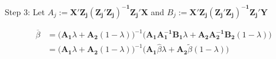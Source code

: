 \documentclass[14pt]{extreport}
\begin{document}
\begin{enumerate}
    Step 3: Let \( A_j := \mathbf{X'Z_j(Z_j'Z_j)^{-1}Z_j'X} \) and \( B_j := \mathbf{X'Z_j(Z_j'Z_j)^{-1}Z_j'Y} \)

    \begin{align*}
        \overline{\beta} &= \Big(\mathbf{A_1}\lambda + \mathbf{A_2}(1-\lambda)\Big)^{-1}\Big(\mathbf{A_1A_1^{-1}B_1}\lambda + \mathbf{A_2A_2^{-1}B_2}(1-\lambda)\Big) \\
        &= \Big(\mathbf{A_1}\lambda + \mathbf{A_2}(1-\lambda)\Big)^{-1}\Big(\mathbf{A_1}\widehat{\beta}\lambda + \mathbf{A_2}\widetilde{\beta}(1-\lambda)\Big)
    \end{align*}


\end{enumerate}
\end{document}
